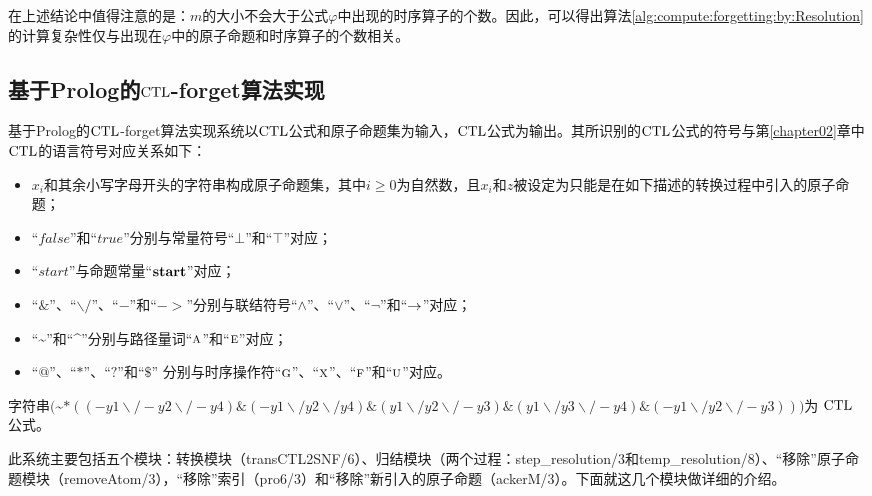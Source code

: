 在上述结论中值得注意的是：$m$的大小不会大于公式$\varphi$中出现的时序算子的个数。因此，可以得出算法\ref{alg:compute:forgetting:by:Resolution} 的计算复杂性仅与出现在$\varphi$中的原子命题和时序算子的个数相关。

\subsection{基于Prolog的$\textrm{CTL}$-forget算法实现}
\label{cha5:subsec:prolog}
基于Prolog的$\textrm{CTL}$-forget算法实现系统以$\textrm{CTL}$公式和原子命题集为输入，$\textrm{CTL}$公式为输出。其所识别的$\textrm{CTL}$公式的符号与第\ref{chapter02}章中$\textrm{CTL}$的语言符号对应关系如下：
\begin{itemize}
	\item $x_i$和其余小写字母开头的字符串构成原子命题集，其中$i\geq 0$为自然数，且$x_i$和$z$被设定为只能是在如下描述的转换过程中引入的原子命题；%
	\item “$false$”和“$true$”分别与常量符号“$\bot$”和“$\top$”对应；
	\item “$start$”与命题常量“$\textbf{start}$”对应；
	\item “$\&$”、“$\backslash/$”、“$-$”和“$->$”分别与联结符号“$\wedge$”、“$\vee$”、“$\neg$”和“$\rightarrow$”对应；%
	\item “\textasciitilde”和“\textasciicircum”分别与路径量词“$\textsc{a}$”和“$\textsc{e}$”对应；
	\item “$@$”、“$*$”、“$?$”和“$\$$” 分别与时序操作符“$\textsc{g}$”、“$\textsc{x}$”、“$\textsc{f}$”和“$\textsc{u}$”对应。
\end{itemize}
\begin{example}
	字符串$($\textasciitilde $* ((-y1\backslash/ -y2\backslash/ -y4)\& (-y1\backslash/y2\backslash/y4)\& (y1\backslash/y2\backslash/ -y3)\& (y1\backslash/y3\backslash/ -y4)\& (-y1\backslash/y2\backslash/ -y3)))$为 $\textrm{CTL}$ 公式。
\end{example}

此系统主要包括五个模块：转换模块（transCTL2SNF/6）、归结模块（两个过程：step\_resolution/3和temp\_resolution/8）、“移除”原子命题模块（removeAtom/3），“移除”索引（pro6/3）和“移除”新引入的原子命题（ackerM/3）。下面就这几个模块做详细的介绍。

